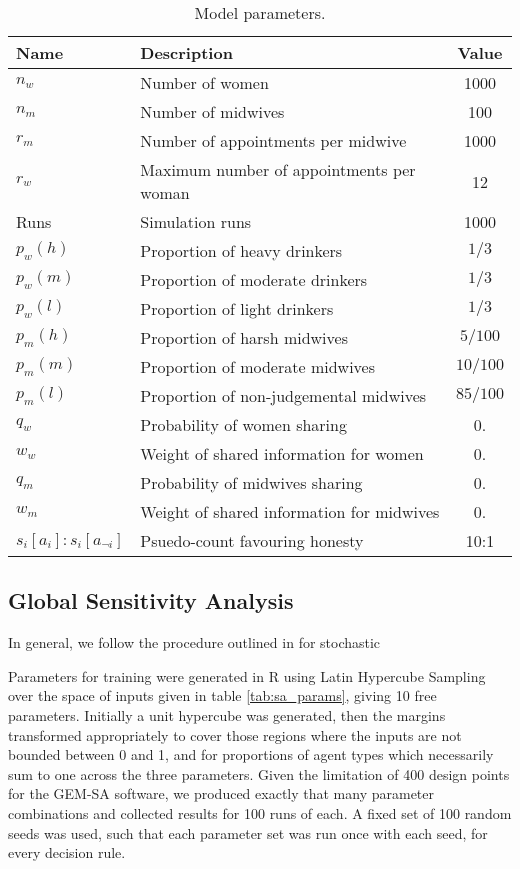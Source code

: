 \begin{table}
\center
\begin{tabular} {|l | l | c|}
\hline
Name & Description & Value \\ \hline
\(n_{w}\) & Number of women & 1000 \\ \hline
\(n_{m}\) & Number of midwives & 100 \\ \hline
\(r_{m}\) & Number of appointments per midwive & 1000 \\ \hline
\(r_{w}\) & Maximum number of appointments per woman & 12 \\ \hline
Runs & Simulation runs & 1000 \\ \hline
\(p_{w}(h)\) & Proportion of heavy drinkers & \(1/3\) \\ \hline
\(p_{w}(m)\) & Proportion of moderate drinkers & \(1/3\) \\ \hline
\(p_{w}(l)\) & Proportion of light drinkers & \(1/3\) \\ \hline
\(p_{m}(h)\) & Proportion of harsh midwives & \(5/100\) \\ \hline
\(p_{m}(m)\) & Proportion of moderate midwives & \(10/100\) \\ \hline
\(p_{m}(l)\) & Proportion of non-judgemental midwives & \(85/100\) \\ \hline
\(q_{w}\) & Probability of women sharing & 0. \\ \hline
\(w_{w}\) & Weight of shared information for women & 0. \\ \hline
\(q_{m}\) & Probability of midwives sharing & 0. \\ \hline
\(w_{m}\) & Weight of shared information for midwives & 0. \\ \hline
\(s_{i}[a_{i}]:s_{i}[a_{\neg i}]\) & Psuedo-count favouring honesty & 10:1 \\ \hline
\end{tabular}
\caption[Table caption text]{Model parameters. \label{tab:qt_params}}
\end{table}
\subsection{Global Sensitivity Analysis}
\label{sub:sensitivity}
In general, we follow the procedure outlined in \cite{Bijak2013b} for stochastic 

Parameters for training were generated in R \citep{RTeam2014} using Latin Hypercube Sampling \citep{Carnell2012} over the space of inputs given in table \ref{tab:sa_params}, giving 10 free parameters. Initially a unit hypercube was generated, then the margins transformed appropriately to cover those regions where the inputs are not bounded between 0 and 1, and for proportions of agent types which necessarily sum to one across the three parameters. Given the limitation of 400 design points for the \ac{GEM-SA} software, we produced exactly that many parameter combinations and collected results for 100 runs of each. A fixed set of 100 random seeds was used, such that each parameter set was run once with each seed, for every decision rule.

